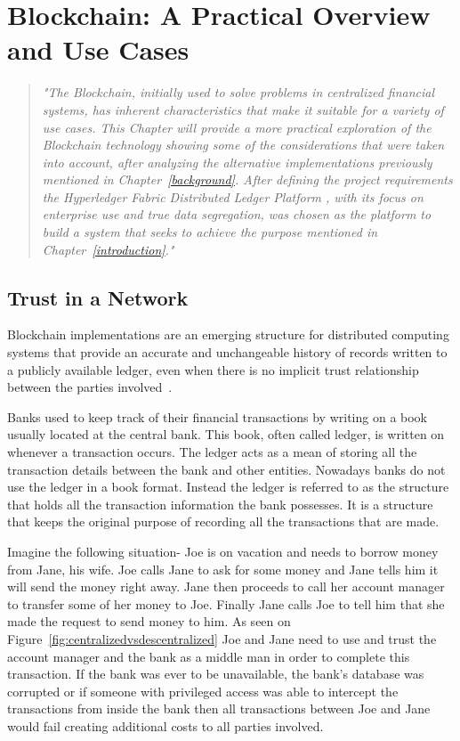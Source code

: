 \chapter{Blockchain: A Practical Overview and Use Cases}\label{blockchain}

\begin{quote} \emph{"The Blockchain, initially used to solve problems in
  centralized financial systems, has inherent characteristics that make it
  suitable for a variety of use cases. This Chapter will provide a more
  practical exploration of the Blockchain technology showing some of the
  considerations that were taken into account, after analyzing the alternative
  implementations previously mentioned in Chapter~\ref{background}. After
  defining the project requirements the Hyperledger Fabric Distributed Ledger
  Platform , with its focus on enterprise use and true data segregation, was
  chosen as the platform to build a system that seeks to achieve the purpose
  mentioned in Chapter~\ref{introduction}."}
\end{quote}

\section{Trust in a Network}

Blockchain implementations are an emerging structure for distributed computing
systems that provide an accurate and unchangeable history of records written to
a publicly available ledger, even when there is no implicit trust relationship
between the parties involved~\cite{Barclay2017}.

Banks used to keep track of their financial transactions by writing on a book
usually located at the central bank. This book, often called ledger, is written
on whenever a transaction occurs. The ledger acts as a mean of storing all the
transaction details between the bank and other entities. Nowadays banks do not
use the ledger in a book format. Instead the ledger is referred to as the
structure that holds all the transaction information the bank possesses. It is
a structure that keeps the original purpose of recording all the transactions
that are made.

Imagine the following situation- Joe is on vacation and needs to borrow money
from Jane, his wife. Joe calls Jane to ask for some money and Jane tells him it
will send the money right away. Jane then proceeds to call her account manager
to transfer some of her money to Joe. Finally Jane calls Joe to tell him that
she made the request to send money to him.  As seen on
Figure~\ref{fig:centralizedvsdescentralized} Joe and Jane need to use and trust
the account manager and the bank as a middle man in order to complete this
transaction. If the bank was ever to be unavailable, the bank's database was
corrupted or if someone with  privileged access was able to intercept the
transactions from inside the bank then all transactions between Joe and Jane
would fail creating additional costs to all parties involved. 

